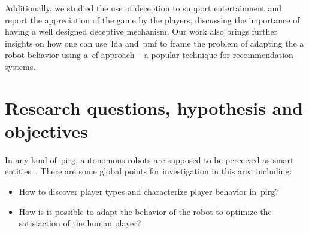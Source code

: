 Additionally, we studied the use of deception to support entertainment and report the appreciation of the game by the players, discussing the importance of having a well designed deceptive mechanism. Our work also brings further insights on how one can use~\gls{lda} and~\gls{pmf} to frame the problem of adapting the a robot behavior using a~\gls{cf} approach -- a popular technique for recommendation systems.


\section{Research questions, hypothesis and objectives}\label{sec:research_question}
In any kind of~\gls{pirg}, autonomous robots are supposed to be perceived as smart entities~\citep{martinoia_physically_2013, bonarini_timing_2014}. There are some global points for investigation in this area including:

\begin{itemize}
\item How to discover player types and characterize player behavior in~\gls{pirg}? 
\item How is it possible to adapt the behavior of the robot to optimize the satisfaction of the human player?
\end{itemize}

